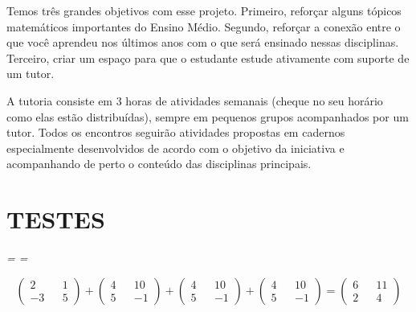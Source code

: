 \documentclass[10pt,openany]{book}
\makeatletter
\theoremstyle{estiloQuestao}
\theoremstyle{plain}
\newlength{\identacao}
\newenvironment{caixaExemplo}{\begin{tcolorbox}[%
	grow to left by=1\gridM,
	left=2pt,
	grow to right by=1\gridM,
	right=2pt,
	boxrule=0pt,
	arc=0pt,
	colframe=boxbg,
	colback=boxbg,
	breakable
]
\itshape
\leftskip=\identacao
\rightskip=\identacao}{\end{tcolorbox}}
\def\divisoria{\bgroup \markoverwith{\lower3.5\p@\hbox{\sixly \color{titlecolor} \char58}}\ULon}
\def\divisoriapadrao{\divisoria{\hspace{14\gridM}}}
\newcommand{\tituloComOndulado}[1]{%
\begin{tcolorbox}[%
	grow to left by=2\gridM,
	left=0pt,
	grow to right by=2\gridM,
	right=0pt,
	boxrule=0pt,
	arc=0pt,
	colframe=boxbg,
	colback=white
]
	\ArchivoBlackFourteen
	{\hspace{-1pt}\divisoriapadrao \vspace{10pt}}\linebreak

	\vspace{-10pt}
	\parindent=0pt
	\hangindent=0pt
	\raggedright
	\color{titlecolor}\MakeUppercase{#1}
\end{tcolorbox}
}
\makeatother
\begin{document}
Temos três grandes objetivos com esse projeto. Primeiro, reforçar alguns tópicos matemáticos importantes do Ensino Médio. Segundo, reforçar a conexão entre o que você aprendeu nos últimos anos com o que será ensinado nessas disciplinas. Terceiro, criar um espaço para que o estudante estude ativamente com suporte de um tutor.

\tituloComOndulado{Isto é um teste}

A tutoria consiste em 3 horas de atividades semanais (cheque no seu horário como elas estão distribuídas), sempre em pequenos grupos acompanhados por um tutor. Todos os encontros seguirão atividades propostas em cadernos especialmente desenvolvidos de acordo com o objetivo da iniciativa e acompanhando de perto o conteúdo das disciplinas principais.

\section{TESTES}

\lipsum[1]




\begin{caixaExemplo}

\lipsum[1]

$$\begin{pmatrix} 2 && 1 \\ -3 && 5 \end{pmatrix} + \begin{pmatrix} 4 && 10 \\ 5 && -1 \end{pmatrix} + \begin{pmatrix} 4 && 10 \\ 5 && -1 \end{pmatrix} + \begin{pmatrix} 4 && 10 \\ 5 && -1 \end{pmatrix} = \begin{pmatrix} 6 && 11 \\ 2 && 4  \end{pmatrix}$$


\end{caixaExemplo}
\end{document}
